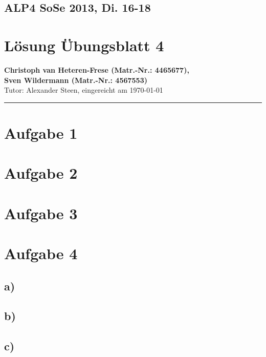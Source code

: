 \documentclass[11pt,a4paper,DIV=10,]{scrartcl}
\begin{document}
\onecolumn
\subsection*{ALP4 SoSe 2013, Di. 16-18}
\section*{Lösung Übungsblatt 4}
\textbf{Christoph van Heteren-Frese (Matr.-Nr.: 4465677), \\ Sven Wildermann (Matr.-Nr.: 4567553)}\\
Tutor: Alexander Steen, eingereicht am \today\\
\hrule
\section*{Aufgabe 1}
\section*{Aufgabe 2}
\section*{Aufgabe 3}
\section*{Aufgabe 4}
\subsection*{a)}
\subsection*{b)}
\subsection*{c)}



\end{document}
